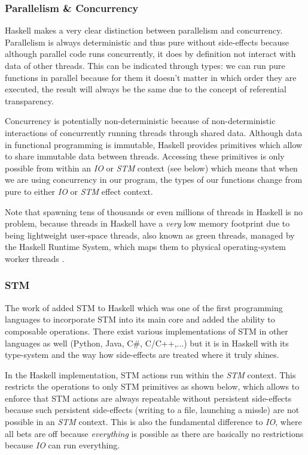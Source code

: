 \subsubsection{Parallelism \& Concurrency}
Haskell makes a very clear distinction between parallelism and concurrency. Parallelism is always deterministic and thus pure without side-effects because although parallel code runs concurrently, it does by definition not interact with data of other threads. This can be indicated through types: we can run pure functions in parallel because for them it doesn't matter in which order they are executed, the result will always be the same due to the concept of referential transparency.

Concurrency is potentially non-deterministic because of non-deterministic interactions of concurrently running threads through shared data. Although data in functional programming is immutable, Haskell provides primitives which allow to share immutable data between threads. Accessing these primitives is only possible from within an \textit{IO} or \textit{STM} context (see below) which means that when we are using concurrency in our program, the types of our functions change from pure to either \textit{IO} or \textit{STM} effect context.

Note that spawning tens of thousands or even millions of threads in Haskell is no problem, because threads in Haskell have a \textit{very} low memory footprint due to being lightweight user-space threads, also known as green threads, managed by the Haskell Runtime System, which maps them to physical operating-system worker threads \cite{marlow_runtime_2009}.

\subsubsection{STM}
The work of \cite{harris_composable_2005, harris_transactional_2006} added STM to Haskell which was one of the first programming languages to incorporate STM into its main core and added the ability to composable operations. There exist various implementations of STM in other languages as well (Python, Java, C\#, C/C++,...) but it is in Haskell with its type-system and the way how side-effects are treated where it truly shines.

In the Haskell implementation, STM actions run within the \textit{STM} context. This restricts the operations to only STM primitives as shown below, which allows to enforce that STM actions are always repeatable without persistent side-effects because such persistent side-effects (writing to a file, launching a missle) are not possible in an \textit{STM} context. This is also the fundamental difference to  \textit{IO}, where all bets are off because \textit{everything} is possible as there are basically no restrictions because \textit{IO} can run everything.

